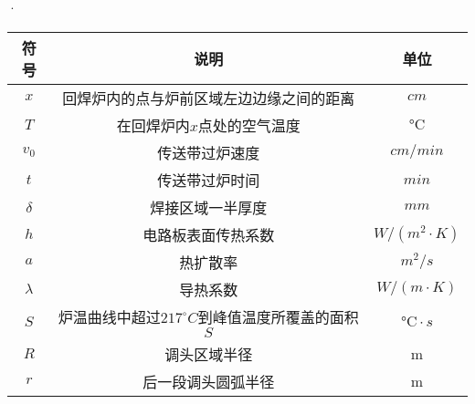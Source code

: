 \documentclass[../main.tex]{subfiles}
\begin{document}
\begin{table}[H]
    \centering·
    \renewcommand{\arrayrulewidth}{2.0pt}
    \begin{tabular}{ccc}
   \hline
    符号 & 说明 & 单位  \\ 
    \hline
      $x$                 & 回焊炉内的点与炉前区域左边边缘之间的距离                   & $ cm$                      \\
    $T$                   & 在回焊炉内$x$点处的空气温度                  &  $°\text{C}$                   \\
    $v_0$                    & 传送带过炉速度          & $cm/min$                      \\
$t$      & 传送带过炉时间                  & $min $                     \\
 $\delta$                      & 焊接区域一半厚度                     & $mm $              \\
 $h$                  & 电路板表面传热系数           & $W/\left( m^2\cdot K \right) $                     \\
$a$             &   热扩散率     & $m^2/s$                     \\
$\lambda$                    & 导热系数        & $W/\left( m\cdot K \right) $                     \\
$S$                   & 炉温曲线中超过$217^{\circ}C$到峰值温度所覆盖的面积$S$                     & $°\text{C}\cdot s$                      \\
  $R$                     & 调头区域半径                     & m                      \\
    $r$                      & 后一段调头圆弧半径                      & m                       \\
   \hline
    \end{tabular}
    \end{table}
\end{document}
